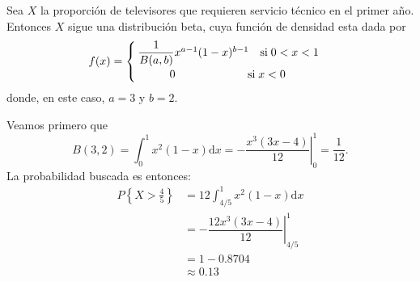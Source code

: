 \begin{sol}
	Sea $X$ la proporción de televisores que requieren servicio técnico en el primer año. Entonces $X$ sigue una distribución beta, cuya función de densidad esta dada por
	\[ 
	f(x) = \begin{cases}
	\hspace{.2em} \dfrac{1}{B(a,b)} x^{a-1}(1-x)^{b-1} \quad \text{si} \; 0<x<1 \\
	\hspace{3em} 0 \hspace{6.4em} \text{si} \; x<0
	\end{cases}
	\]
	donde, en este caso, $a = 3$ y $b = 2$.
	
	Veamos primero que
	\[ B(3,2) = \int_{0}^{1} x^2(1-x) \mathrm{d}x = \left. -\dfrac{x^3\left(3x-4\right)}{12} \right\rvert_{0}^{1} = \frac{1}{12}. \]
	La probabilidad buscada es entonces:
	\begin{align*}
		P\left\{X>\frac{4}{5}\right\} &= 12 \int_{4/5}^{1} x^2(1-x) \mathrm{d}x \\
									  &= \left.  -\dfrac{12x^3\left(3x-4\right)}{12} \right\rvert_{4/5}^{1} \\
									  &= 1 - 0.8704 \\
									  &\approx 0.13
	\end{align*}
\end{sol}	
